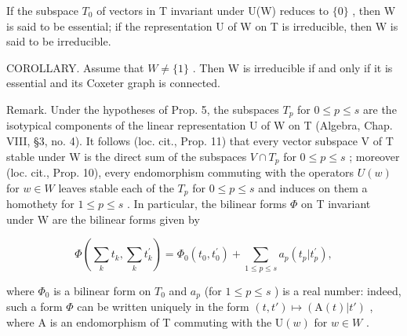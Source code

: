 If the subspace \(T_{0}\) of vectors in T invariant under U(W) reduces to \(\{0\}\) , then W is said to be essential; if the representation U of W on T is irreducible, then W is said to be irreducible.

COROLLARY. Assume that \(W \neq \{1\}\) . Then W is irreducible if and only if it is essential and its Coxeter graph is connected.

Remark. Under the hypotheses of Prop. 5, the subspaces \(T_{p}\) for \(0 \leqslant p \leqslant s\) are the isotypical components of the linear representation U of W on T (Algebra, Chap. VIII, §3, no. 4). It follows (loc. cit., Prop. 11) that every vector subspace V of T stable under W is the direct sum of the subspaces \(V \cap T_{p}\) for \(0 \leqslant p \leqslant s\) ; moreover (loc. cit., Prop. 10), every endomorphism commuting with the operators \(U(w)\) for \(w \in W\) leaves stable each of the \(T_{p}\) for \(0 \leqslant p \leqslant s\) and induces on them a homothety for \(1 \leqslant p \leqslant s\) . In particular, the bilinear forms \(\Phi\) on T invariant under W are the bilinear forms given by

\[
\varPhi \left(\sum_ {k} t _ {k}, \sum_ {k} t _ {k} ^ {\prime}\right) = \varPhi_ {0} (t _ {0}, t _ {0} ^ {\prime}) + \sum_ {1 \leqslant p \leqslant s} a _ {p} (t _ {p} | t _ {p} ^ {\prime}),
\]

where \(\Phi_{0}\) is a bilinear form on \(T_{0}\) and \(a_{p}\) (for \(1 \leqslant p \leqslant s\) ) is a real number: indeed, such a form \(\Phi\) can be written uniquely in the form \((t, t') \mapsto (\mathrm{A}(t)|t')\) , where A is an endomorphism of T commuting with the \(\mathrm{U}(w)\) for \(w \in W\) .
\relax{}
